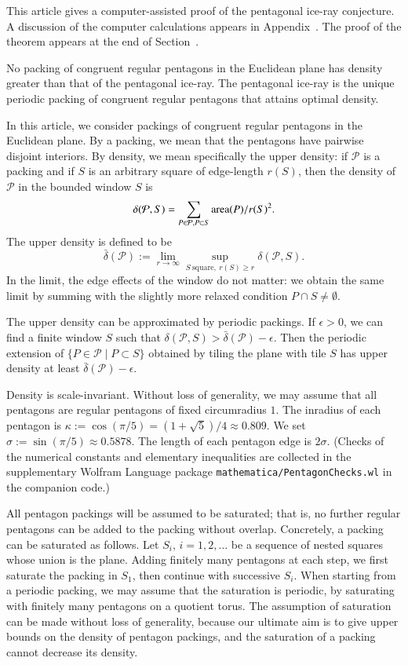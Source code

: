 This article gives a computer-assisted proof of the pentagonal ice-ray
conjecture.  A discussion of the computer calculations appears in
Appendix~.
The proof of the theorem appears at the end of Section~.

\begin{theorem}  
  No packing of congruent regular pentagons in the Euclidean plane has
  density greater than that of the pentagonal ice-ray.  The pentagonal
  ice-ray is the unique periodic packing of congruent regular
  pentagons that attains optimal density.
\end{theorem}

In this article, we consider packings of congruent regular pentagons
in the Euclidean plane.  By a packing, we mean that the pentagons have
pairwise disjoint interiors.  By density, we mean specifically the
upper density: if ${\mathcal P}$ is a packing and if $S$ is an arbitrary square
of edge-length $r(S)$, then the density of $\mathcal P$ in the bounded
window $S$ is
\[
\delta({\mathcal P},S) = \sum_{P\in {\mathcal P},P\subset S}{{\operatorname{area}}(P)}/{r(S)^2}.
\]
The upper density is defined to be
\[
\bar\delta({\mathcal P}):=\lim_{r\to\infty}
\sup_{S~\text{square},~r(S)\ge r}\delta({\mathcal P},S).
\]
In the limit, the edge effects of the window do not matter:  we obtain
the same limit by summing with the slightly more relaxed condition
$P\cap S\ne\emptyset$.

The upper density can be approximated by periodic packings.  If
$\epsilon >0$, we can find a finite window $S$ such that
$\delta({\mathcal P},S)>\bar\delta({\mathcal P})-\epsilon$.  Then the
periodic extension of $\{P\in {\mathcal P}\mid P\subset S\}$ obtained
by tiling the plane with tile $S$ has upper density at least
$\bar\delta({\mathcal P})-\epsilon$.

Density is scale-invariant.  Without loss of
generality, we may assume that all pentagons are regular pentagons of
fixed circumradius $1$.  The inradius of each pentagon is $\kappa:=
\cos (\pi/5) = (1+\sqrt{5})/4 \approx 0.809$. We set $\sigma :=
\sin(\pi/5) \approx 0.5878$.  The length of each pentagon edge is
$2\sigma$.  (Checks of the numerical constants and elementary inequalities
are collected in the supplementary Wolfram Language package
{\tt mathematica/\allowbreak PentagonChecks.wl} in the companion code.)

All pentagon packings will be assumed to be saturated; that is, no
further regular pentagons can be added to the packing without overlap.
Concretely, a packing can be saturated as follows.  Let $S_i$,
$i=1,2,\ldots$ be a sequence of nested squares whose union is the
plane.  Adding finitely many pentagons at each step, we first saturate
the packing in $S_1$, then continue with successive $S_i$.
When starting from a periodic packing, we may assume that the saturation
is periodic, by saturating with finitely many pentagons on a quotient torus.
The
assumption of saturation can be made without loss of generality,
because our ultimate aim is to give upper bounds on the density of
pentagon packings, and the saturation of a packing cannot decrease its
density.

